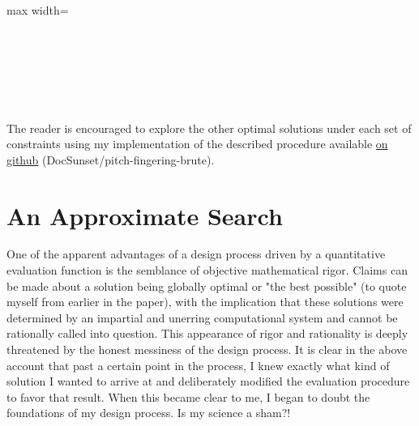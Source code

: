 \documentclass[sigconf]{nimeart}
\begin{document}
\begin{table}[htbp]
\begin{adjustbox}{max width=\textwidth}
\begin{tabular}
 \\
 \\
 \\
 \\
 \\
\bottomrule
\end{tabular}\end{adjustbox}\end{table}

The reader is encouraged to explore the other optimal solutions under each set of constraints using my implementation of the described procedure available \href{https://github.com/DocSunset/pitch-fingering-brute}{on github} (DocSunset/pitch-fingering-brute).

\section{An Approximate Search}\label{an-approximate-search}

One of the apparent advantages of a design process driven by a quantitative evaluation function is the semblance of objective mathematical rigor. Claims can be made about a solution being globally optimal or "the best possible" (to quote myself from earlier in the paper), with the implication that these solutions were determined by an impartial and unerring computational system and cannot be rationally called into question. This appearance of rigor and rationality is deeply threatened by the honest messiness of the design process. It is clear in the above account that past a certain point in the process, I knew exactly what kind of solution I wanted to arrive at and deliberately modified the evaluation procedure to favor that result. When this became clear to me, I began to doubt the foundations of my design process. Is my science a sham?!
\end{document}
